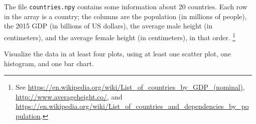 \begin{problem}
The file \texttt{countries.npy} contains some information about 20 countries.
Each row in the array is a country; the columns are the population (in millions of people), the 2015 GDP (in billions of US dollars), the average male height (in centimeters), and the average female height (in centimeters), in that order.%
\footnote{
See \url{https://en.wikipedia.org/wiki/List_of_countries_by_GDP_(nominal)}, \url{http://www.averageheight.co/}, and
\url{https://en.wikipedia.org/wiki/List_of_countries_and_dependencies_by_population}.
}

Visualize the data in at least four plots, using at least one scatter plot, one histogram, and one bar chart.
\end{problem}

